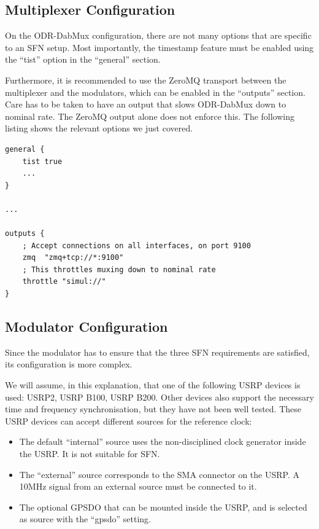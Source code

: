 
\subsection{Multiplexer Configuration}
On the ODR-DabMux configuration, there are not many options that are specific to
an SFN setup.
Most importantly, the timestamp feature must be enabled using the ``tist'' option in
the ``general'' section.

Furthermore, it is recommended to use the ZeroMQ transport between the
multiplexer and the modulators, which can be enabled in the ``outputs'' section.
Care has to be taken to have an output that slows ODR-DabMux down to nominal
rate. The ZeroMQ output alone does not enforce this. The following listing shows
the relevant options we just covered.

\begin{lstlisting}
general {
    tist true
    ...
}

...

outputs {
    ; Accept connections on all interfaces, on port 9100
    zmq  "zmq+tcp://*:9100"
    ; This throttles muxing down to nominal rate
    throttle "simul://"
}
\end{lstlisting}

\subsection{Modulator Configuration}
Since the modulator has to ensure that the three SFN requirements are satisfied,
its configuration is more complex.

We will assume, in this explanation, that one of the following USRP devices is
used: USRP2, USRP B100, USRP B200. Other devices also support the necessary time
and frequency synchronisation, but they have not been well tested. These USRP
devices can accept different sources for the reference clock:
\begin{itemize}
    \item The default ``internal'' source uses the non-disciplined
        clock generator inside the USRP. It is not suitable for SFN.
    \item The ``external'' source corresponds to the SMA connector on
        the USRP. A 10MHz signal from an external source must be connected to
        it.
    \item The optional GPSDO that can be mounted inside the USRP, and is
        selected as source with the ``gpsdo'' setting.
\end{itemize}

